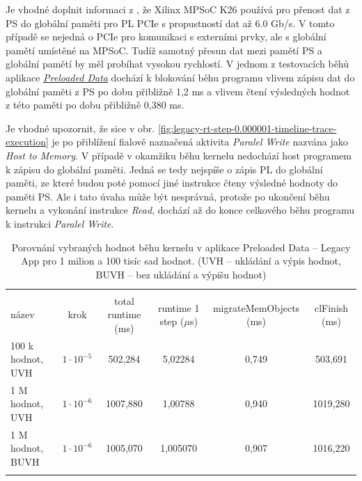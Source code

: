 \documentclass[a4paper, twoside, 11pt]{article}
\begin{document}
		Je vhodné doplnit informaci z \cite{kria-k26-som-ds}, že Xilinx MPSoC K26 používá pro přenost dat z PS do globální paměti pro PL PCIe s propustností dat až 6.0 Gb/s. V tomto případě se nejedná o PCIe pro komunikaci s externími prvky, ale s globální pamětí umístěné na MPSoC. Tudíž samotný přesun dat mezi pamětí PS a globální pamětí by měl probíhat vysokou rychlostí. V jednom z testovacích běhů aplikace \hyperref[subsec:preloaded-data]{\textit{Preloaded Data}} dochází k blokování běhu programu vlivem zápisu dat do globální paměti z PS po dobu přibližně 1,2 ms a vlivem čtení výsledných hodnot z této paměti po dobu přibližně 0,380 ms.\par
		Je vhodné upozornit, že sice v obr. \ref{fig:legacy-rt-step-0.000001-timeline-trace-execution} je po přiblížení fialově naznačená aktivita \textit{Paralel Write} nazvána jako \textit{Host to Memory}. V případě v okamžiku běhu kernelu nedochází host programem k zápisu do globální paměti. Jedná se tedy nejspíše o zápis PL do globální paměti, ze které budou poté pomocí jiné instrukce čteny výsledné hodnoty do paměti PS. Ale i tato úvaha může být nesprávná, protože po ukončení běhu kernelu a vykonání instrukce \textit{Read}, dochází až do konce celkového běhu programu k instrukci \textit{Paralel Write}.\par
		
	

		\begin{table}[H]
		\centering
		\caption{Porovnání vybraných hodnot běhu kernelu v aplikace Preloaded Data – Legacy App pro 1 milion a 100 tisíc sad hodnot. (UVH – ukládání a výpis hodnot, BUVH – bez ukládání a výpišu hodnot)}
		\vspace*{0.15cm}
		\resizebox{\textwidth}{!}
		{
		\begin{tabular}{!{\vrule width 2pt} l | c | c | c | c | c !{\vrule width 2pt}}
		\\
		název & krok & total runtime (ms) & runtime 1 step ($\mu$s) & migrateMemObjects (ms) & clFinish (ms)\\
		100 k hodnot, UVH & $1\cdot 10^{-5}$ & 502,284 & 5,02284 & 0,749 & 503,691\\  M hodnot, UVH & $1\cdot 10^{-6}$ & 1007,880 & 1,00788 & 0,940 & 1019,280 \\  M hodnot, BUVH & $1\cdot 10^{-6}$ & 1005,070 & 1,005070 & 0,907 & 1016,220\\
			\end{tabular}
		}
			\label{tab:porovnani-vybranych-hodnot-behu-kernelu-pro-1M-100k-sad-hodnot}
	\end{table}
\end{document}
